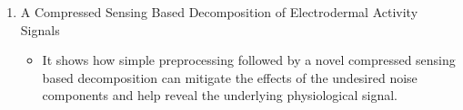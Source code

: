 \documentclass[]{article}
\begin{document}
\begin{enumerate}
\begin{itemize}
  \end{itemize}
  \item A Compressed Sensing Based Decomposition of Electrodermal Activity Signals~\cite{jain2016compressed}
  \begin{itemize}
    \item It shows how simple preprocessing followed by a novel compressed sensing based decomposition can mitigate the effects of the undesired noise components and help reveal the underlying physiological signal. 
  \end{itemize}
\end{enumerate}



\end{document}
